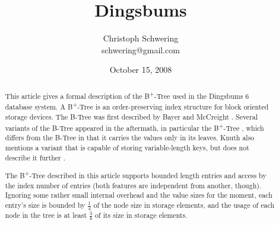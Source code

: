 \documentclass[a4paper, 8pt]{scrartcl}
\title{Dingsbums \BTree}
\date{October 15, 2008}
\author{Christoph Schwering\\{schwering@gmail.com}}
\theoremstyle{plain}
\theoremstyle{definition}
\theoremstyle{remark}
\newcommand \BTree { B\textsuperscript{+}-Tree }
\begin{document}



\maketitle

\begin{abstract}
This article gives a formal description of the \BTree used in the Dingsbums 6
database system.
A \BTree is an order-preserving index structure for block oriented storage
devices.
The B-Tree was first described by Bayer and McCreight \cite{Bayer}.
Several variants of the B-Tree appeared in the aftermath, in particular the
\BTree \cite{Cormen, KnuthBTree}, which differs from the B-Tree in that it
carries the values only in its leaves.
Knuth also mentions a variant that is capable of storing variable-length
keys, but does not describe it further \cite{KnuthBTree}.

The \BTree described in this article supports bounded length entries 
and access by the index number of entries (both features are independent from
another, though).
Ignoring some rather small internal overhead and the value sizes for the 
moment, each entry's size is bounded by $\tfrac{1}{4}$ of the node size
in storage elements, and the usage of each node in the tree is at least
$\tfrac{3}{8}$ of its size in storage elements.
\end{abstract}
\end{document}
